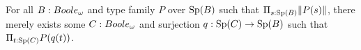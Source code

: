 
\begin{axiom}\label{AxLocalChoice}
  For all $B:\Boole$ and type family $P$ over $\operatorname{Sp}(B)$ such that 
  $\Pi_{s:\operatorname{Sp}(B)} \lVert P(s) \rVert$, there 
  merely exists some $C:\Boole$ and surjection $q:\operatorname{Sp}(C)\to \operatorname{Sp}(B)$ such that 
 $\Pi_{t:\operatorname{Sp}(C)} P(q(t))$.
\end{axiom}

